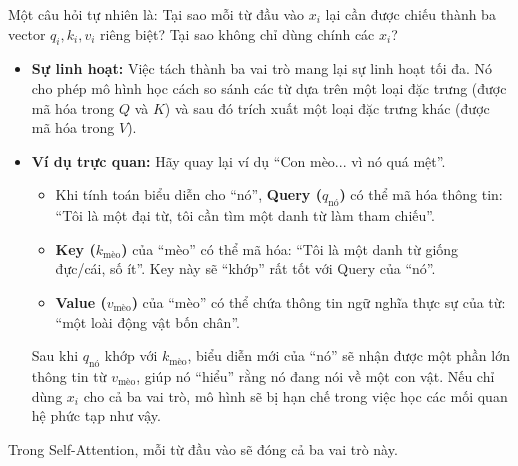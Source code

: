 \begin{tcolorbox}[
    title={Tại sao lại cần đến ba vai trò Q, K, V?},
    colback=green!5!white, colframe=green!50!black, fonttitle=\bfseries
]
Một câu hỏi tự nhiên là: Tại sao mỗi từ đầu vào $x_i$ lại cần được chiếu thành ba vector $q_i, k_i, v_i$ riêng biệt? Tại sao không chỉ dùng chính các $x_i$?
\begin{itemize}
    \item \textbf{Sự linh hoạt:} Việc tách thành ba vai trò mang lại sự linh hoạt tối đa. Nó cho phép mô hình học cách so sánh các từ dựa trên một loại đặc trưng (được mã hóa trong $Q$ và $K$) và sau đó trích xuất một loại đặc trưng khác (được mã hóa trong $V$).
    \item \textbf{Ví dụ trực quan:} Hãy quay lại ví dụ “Con mèo... vì nó quá mệt”.
        \begin{itemize}
            \item Khi tính toán biểu diễn cho “nó”, \textbf{Query ($q_{\text{nó}}$)} có thể mã hóa thông tin: “Tôi là một đại từ, tôi cần tìm một danh từ làm tham chiếu”.
            \item \textbf{Key ($k_{\text{mèo}}$)} của “mèo” có thể mã hóa: “Tôi là một danh từ giống đực/cái, số ít”. Key này sẽ “khớp” rất tốt với Query của “nó”.
            \item \textbf{Value ($v_{\text{mèo}}$)} của “mèo” có thể chứa thông tin ngữ nghĩa thực sự của từ: “một loài động vật bốn chân”.
        \end{itemize}
        Sau khi $q_{\text{nó}}$ khớp với $k_{\text{mèo}}$, biểu diễn mới của “nó” sẽ nhận được một phần lớn thông tin từ $v_{\text{mèo}}$, giúp nó “hiểu” rằng nó đang nói về một con vật. Nếu chỉ dùng $x_i$ cho cả ba vai trò, mô hình sẽ bị hạn chế trong việc học các mối quan hệ phức tạp như vậy.
\end{itemize}
\end{tcolorbox}

Trong Self-Attention, mỗi từ đầu vào sẽ đóng cả ba vai trò này.
